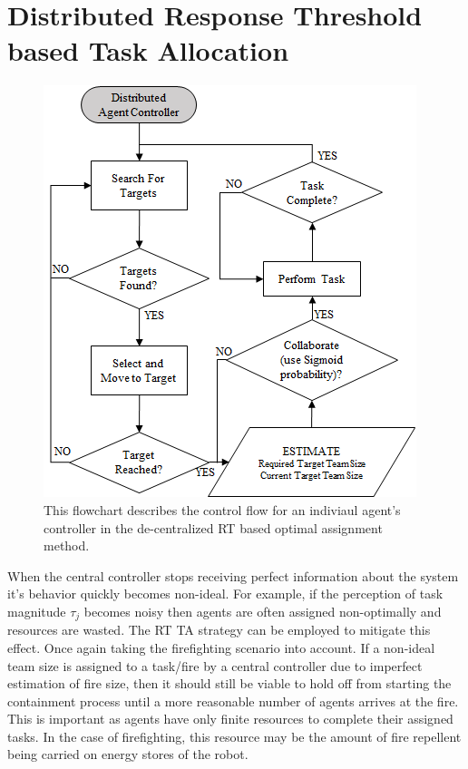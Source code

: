 \documentclass[12pt]{book}
\begin{document}
\section{Distributed Response Threshold\\based Task Allocation}
\begin{figure}[!ht]
\centering\includegraphics[width=.5\columnwidth]{../assets/DistributedController.png}
\centering\caption{This flowchart describes the control flow for an indiviaul agent's controller in the de-centralized RT based optimal assignment method.}\label{fig:distcontrol}
\end{figure}
When the central controller stops receiving perfect information about the system it's behavior 
quickly becomes non-ideal. For example, if the perception of task magnitude $\tau_j$ becomes noisy then agents are often assigned non-optimally and resources are wasted. The RT TA strategy can be employed to mitigate this effect. Once again taking the firefighting scenario into account. If a non-ideal team size is assigned to a task/fire by a central controller due to imperfect estimation of fire size, then it should still be viable to hold off from starting the containment process until a more reasonable number of agents arrives at the fire. This is important as agents have only finite resources to complete their assigned tasks. In the case of firefighting, this resource may be the amount of fire repellent being carried on energy stores of the robot.
\end{document}
